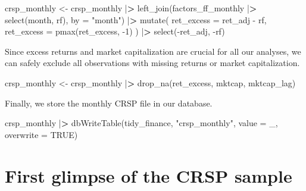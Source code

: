\documentclass[
]{book}
\newenvironment{Shaded}{\begin{snugshade}}{\end{snugshade}}
\newcommand{\AttributeTok}[1]{\textcolor[rgb]{0.61,0.61,0.61}{#1}}
\newcommand{\ConstantTok}[1]{\textcolor[rgb]{0,0,0}{#1}}
\newcommand{\DecValTok}[1]{\textcolor[rgb]{0.06,0.06,0.06}{#1}}
\newcommand{\ErrorTok}[1]{\textcolor[rgb]{0.14,0.14,0.14}{\textbf{#1}}}
\newcommand{\FunctionTok}[1]{\textcolor[rgb]{0,0,0}{#1}}
\newcommand{\NormalTok}[1]{#1}
\newcommand{\OtherTok}[1]{\textcolor[rgb]{0.37,0.37,0.37}{#1}}
\newcommand{\SpecialCharTok}[1]{\textcolor[rgb]{0,0,0}{#1}}
\newcommand{\StringTok}[1]{\textcolor[rgb]{0.5,0.5,0.5}{#1}}
\begin{document}
\begin{Shaded}
\begin{Highlighting}[]
\NormalTok{crsp\_monthly }\OtherTok{\textless{}{-}}\NormalTok{ crsp\_monthly }\SpecialCharTok{|}\ErrorTok{\textgreater{}}
  \FunctionTok{left\_join}\NormalTok{(factors\_ff\_monthly }\SpecialCharTok{|}\ErrorTok{\textgreater{}} \FunctionTok{select}\NormalTok{(month, rf), }
            \AttributeTok{by =} \StringTok{"month"}\NormalTok{) }\SpecialCharTok{|}\ErrorTok{\textgreater{}}
  \FunctionTok{mutate}\NormalTok{(}
    \AttributeTok{ret\_excess =}\NormalTok{ ret\_adj }\SpecialCharTok{{-}}\NormalTok{ rf,}
    \AttributeTok{ret\_excess =} \FunctionTok{pmax}\NormalTok{(ret\_excess, }\SpecialCharTok{{-}}\DecValTok{1}\NormalTok{)}
\NormalTok{  ) }\SpecialCharTok{|}\ErrorTok{\textgreater{}}
  \FunctionTok{select}\NormalTok{(}\SpecialCharTok{{-}}\NormalTok{ret\_adj, }\SpecialCharTok{{-}}\NormalTok{rf)}
\end{Highlighting}
\end{Shaded}

Since excess returns and market capitalization are crucial for all our analyses, we can safely exclude all observations with missing returns or market capitalization.

\begin{Shaded}
\begin{Highlighting}[]
\NormalTok{crsp\_monthly }\OtherTok{\textless{}{-}}\NormalTok{ crsp\_monthly }\SpecialCharTok{|}\ErrorTok{\textgreater{}}
  \FunctionTok{drop\_na}\NormalTok{(ret\_excess, mktcap, mktcap\_lag)}
\end{Highlighting}
\end{Shaded}

Finally, we store the monthly CRSP file in our database.

\begin{Shaded}
\begin{Highlighting}[]
\NormalTok{crsp\_monthly }\SpecialCharTok{|}\ErrorTok{\textgreater{}}
  \FunctionTok{dbWriteTable}\NormalTok{(tidy\_finance, }\StringTok{"crsp\_monthly"}\NormalTok{, }\AttributeTok{value =}\NormalTok{ \_, }\AttributeTok{overwrite =} \ConstantTok{TRUE}\NormalTok{)}
\end{Highlighting}
\end{Shaded}

\hypertarget{first-glimpse-of-the-crsp-sample}{%
\section{First glimpse of the CRSP sample}\label{first-glimpse-of-the-crsp-sample}}
\end{document}
